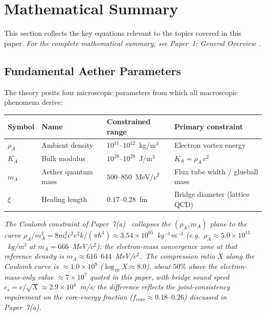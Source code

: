 ﻿\documentclass[12pt,letterpaper]{article}
\newcommand{\rhoa}{\rho_{\!A}}
\newcommand{\Ka}{K_{\!A}}
\begin{document}
\section{Mathematical Summary}

This section collects the key equations relevant to the topics covered in this paper.
\noindent\textit{For the complete mathematical summary, see Paper~1: General Overview \cite{otto-overview}.}

\subsection{Fundamental Aether Parameters}

The theory posits four microscopic parameters from which all macroscopic
phenomena derive:
%
\begin{center}
\begin{tabular}{@{}llll@{}}
\hline
\textbf{Symbol} & \textbf{Name} & \textbf{Constrained range} & \textbf{Primary constraint} \\
\hline
$\rhoa$  & Ambient density     & $10^{11}$--$10^{12}$~kg/m$^3$         & Electron vortex energy \\
$\Ka$    & Bulk modulus         & $10^{28}$--$10^{29}$~J/m$^3$          & $\Ka = \rhoa\,c^2$ \\
$m_A$    & Aether quantum mass  & $500$--$850$~MeV/$c^2$                & Flux tube width / glueball mass \\
$\xi$    & Healing length       & $0.17$--$0.28$~fm                     & Bridge diameter (lattice QCD) \\
\hline
\end{tabular}
\end{center}

\noindent\textit{The Coulomb constraint of Paper~7(a)~\cite{otto-boundcore}
collapses the $(\rhoa, m_A)$ plane to the curve
$\rhoa/m_A^2 = 8 m_e^2 c^2 e^2 k/(\pi\hbar^4) \approx
3.54\times10^{65}$~kg$^{-1}$m$^{-3}$ (e.g.\
$\rhoa \approx 5.0\times10^{11}$~kg/m$^3$ at $m_A = 666$~MeV/$c^2$); the
electron-mass convergence zone at that reference density is
$m_A \approx 616$--$644$~MeV/$c^2$.\ The compression ratio $X$ along the
Coulomb curve is $\approx 1.0\times10^{8}$ ($\log_{10}X \approx 8.0$), about
$50\%$ above the electron-mass-only value $\approx 7\times10^{7}$ quoted in
this paper, with bridge sound speed
$c_s = c/\sqrt{X} \approx 2.9\times10^{4}$~m/s; the difference reflects the
joint-consistency requirement on the core-energy fraction
($f_{\mathrm{core}} \approx 0.18$--$0.26$) discussed in Paper~7(a).}
\end{document}
